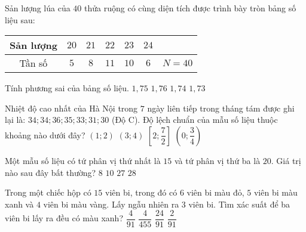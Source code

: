 \begin{ex}
Sản lượng lúa của $40$ thửa ruộng có cùng diện tích được trình bày tròn bảng số liệu sau: 
\begin{center}
\begin{tabular}{|c|c|c|c|c|c|c|}
\hline
Sản lượng & $20$ & $21$ & $22$ & $23$& $24$ & \\
\hline
Tần số & $5$ & $8$ & $11$ & $10$ & $6$ & $N=40$\\
\hline
\end{tabular}
\end{center}
Tính phương sai của bảng số liệu.
\choice
{$1{,}75$}
{\True $1{,}76$}
{$1{,}74$}
{$1{,}73$}
\end{ex}
\begin{ex}
Nhiệt độ cao nhất của Hà Nội trong $7$ ngày liên tiếp trong tháng tám được ghi lại là: $34;34;36;35;33;31;30$ (Độ C). Độ lệch chuẩn của mẫu số liệu thuộc khoảng nào dưới đây?
\choice
{\True $\left(1;2\right)$}
{$\left(3;4\right)$}
{$\left[2;\dfrac{7}{2}\right]$}
{$\left(0;\dfrac{3}{4}\right)$}
\end{ex}
\begin{ex}
Một mẫu số liệu có tứ phân vị thứ nhất là $15$ và tứ phân vị thứ ba là $20$. Giá trị nào sau đây bất thường?
\choice
{$8$}
{$10$}
{$27$}
{\True $28$}
\end{ex}
\begin{ex}
 Trong một chiếc hộp có $15$ viên bi, trong đó có $6$ viên bi màu đỏ, $5$ viên bi màu xanh và $4$ viên bi màu vàng. Lấy ngẫu nhiên ra 3 viên bi. Tìm xác suất để ba viên bi lấy ra đều có màu xanh?
\choice
{$\dfrac{4}{91}$}
{$\dfrac{4}{455}$}
{$\dfrac{24}{91}$}
{\True $\dfrac{2}{91}$}
\end{ex}
